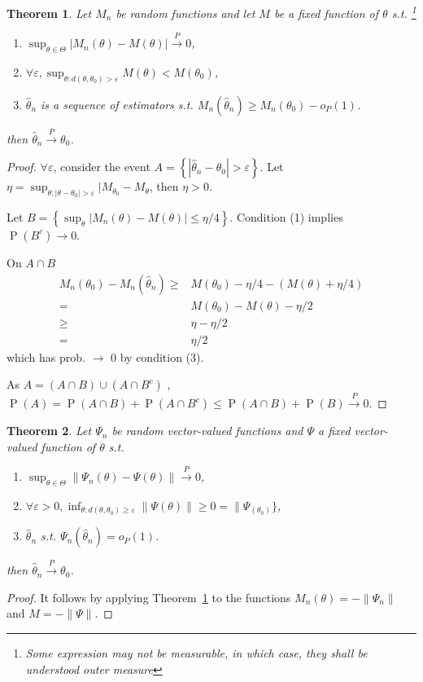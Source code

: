 \documentclass[12pt,a4paper]{article}
\newcommand{\pr}{\mathop{\mathrm{P}}}
\def \inprob {\stackrel{P}{\longrightarrow}}
\newtheorem{theorem}{Theorem}[section]
\begin{document}
\begin{theorem}
  \citep[page 45]{vaart}
  Let $M_n$ be random functions and let $M$ be a fixed function of $\theta$ s.t. 
  \footnote{Some expression may not be measurable, in which case, they shall be understood outer measure}
  \begin{enumerate}
	\item $\sup_{\theta\in\Theta}|M_n(\theta) - M(\theta)|\inprob 0$,
	\item $\forall \varepsilon, \sup_{\theta:d(\theta,\theta_0)>\varepsilon} M(\theta) < M(\theta_0)$,
	\item $\hat{\theta}_n$ is a sequence of estimators s.t. $M_n(\hat{\theta}_n) \ge M_n(\theta_0) - o_P(1)$.
  \end{enumerate}
  then $\hat{\theta}_n\inprob \theta_0$.
  \label{m-est:con}
\end{theorem}
\begin{proof}
  $\forall \varepsilon$, consider the event 
  $A=\left\{ |\hat{\theta}_n - \theta_0|>\varepsilon \right\}$.
  Let 
  $\eta = \sup_{\theta:|\theta-\theta_0|>\varepsilon}|M_{\theta_0} - M_{\theta}$, then 
  $\eta>0$. 

  Let $B= \left\{ \sup_\theta| M_n(\theta) - M(\theta)| \le \eta/4  \right\} $.
  Condition (1) implies %
  $\pr( B^c ) \to 0$.

  On $A \cap B $
  \begin{align*}
	M_n(\theta_0) - M_n(\hat{\theta}_n)
  \ge & M(\theta_0) - \eta/4 - (M(\theta)+\eta/4)\\
  =& M(\theta_0) - M(\theta) - \eta/2\\
  \ge& \eta - \eta/2\\
  =&\eta/2
  \end{align*}
  which has prob. $\to$ 0 by condition (3).

  As $A = (A\cap B) \cup (A\cap B^c) $ ,
  $\pr(A) = \pr(A\cap B) + \pr(A\cap B^c)\le \pr(A\cap B) + \pr (B)\inprob 0$.
\end{proof}

\begin{theorem}
  Let $\Psi_n$ be random vector-valued functions and $\Psi$ a fixed vector-valued function of $\theta$ s.t. 
  \begin{enumerate}
	\item $\sup_{\theta \in \Theta}\|\Psi_n(\theta)-\Psi(\theta)\|\inprob 0$,
	\item $\forall \varepsilon>0, \inf_{\theta:d(\theta,\theta_0)\ge \varepsilon}\|\Psi(\theta)\|\ge 0=\|\Psi_(\theta_0)\}$,
	\item $\hat{\theta}_n$ s.t. $\Psi_n(\hat{\theta}_n)=o_P(1)$.
  \end{enumerate}
	  then $\hat{\theta}_n\inprob \theta_0$.
  \label{z-est:con}
\end{theorem}
\begin{proof}
  It follows by applying Theorem~\ref{m-est:con} to the functions $M_n(\theta) = -\|\Psi_n\|$ and $M = -\|\Psi\|$.
\end{proof}
\end{document}

